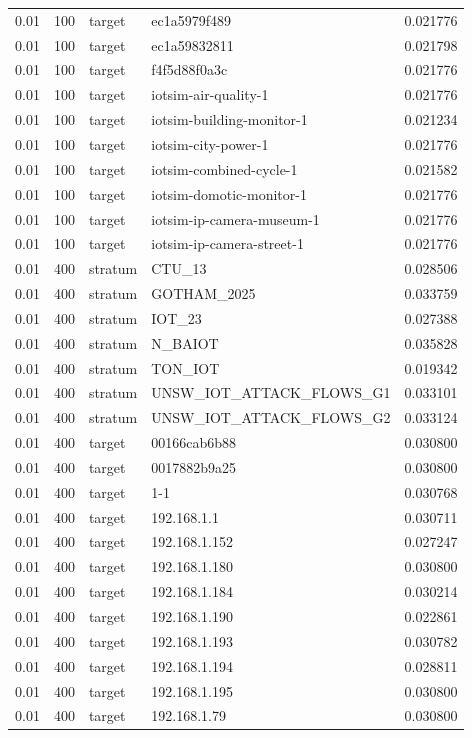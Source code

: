 \begin{tabular}{lllll}
0.01 & 100 & target & ec1a5979f489 & 0.021776 \\
0.01 & 100 & target & ec1a59832811 & 0.021798 \\
0.01 & 100 & target & f4f5d88f0a3c & 0.021776 \\
0.01 & 100 & target & iotsim-air-quality-1 & 0.021776 \\
0.01 & 100 & target & iotsim-building-monitor-1 & 0.021234 \\
0.01 & 100 & target & iotsim-city-power-1 & 0.021776 \\
0.01 & 100 & target & iotsim-combined-cycle-1 & 0.021582 \\
0.01 & 100 & target & iotsim-domotic-monitor-1 & 0.021776 \\
0.01 & 100 & target & iotsim-ip-camera-museum-1 & 0.021776 \\
0.01 & 100 & target & iotsim-ip-camera-street-1 & 0.021776 \\
0.01 & 400 & stratum & CTU\_13 & 0.028506 \\
0.01 & 400 & stratum & GOTHAM\_2025 & 0.033759 \\
0.01 & 400 & stratum & IOT\_23 & 0.027388 \\
0.01 & 400 & stratum & N\_BAIOT & 0.035828 \\
0.01 & 400 & stratum & TON\_IOT & 0.019342 \\
0.01 & 400 & stratum & UNSW\_IOT\_ATTACK\_FLOWS\_G1 & 0.033101 \\
0.01 & 400 & stratum & UNSW\_IOT\_ATTACK\_FLOWS\_G2 & 0.033124 \\
0.01 & 400 & target & 00166cab6b88 & 0.030800 \\
0.01 & 400 & target & 0017882b9a25 & 0.030800 \\
0.01 & 400 & target & 1-1 & 0.030768 \\
0.01 & 400 & target & 192.168.1.1 & 0.030711 \\
0.01 & 400 & target & 192.168.1.152 & 0.027247 \\
0.01 & 400 & target & 192.168.1.180 & 0.030800 \\
0.01 & 400 & target & 192.168.1.184 & 0.030214 \\
0.01 & 400 & target & 192.168.1.190 & 0.022861 \\
0.01 & 400 & target & 192.168.1.193 & 0.030782 \\
0.01 & 400 & target & 192.168.1.194 & 0.028811 \\
0.01 & 400 & target & 192.168.1.195 & 0.030800 \\
0.01 & 400 & target & 192.168.1.79 & 0.030800 \\

\end{tabular}
